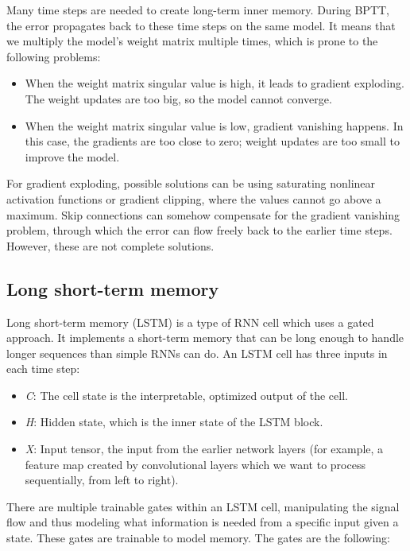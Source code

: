 Many time steps are needed to create long-term inner memory. During BPTT, the error propagates back to these time steps on the same model. It means that we multiply the model's weight matrix multiple times, which is prone to the following problems:

\begin{itemize}
\item When the weight matrix singular value is high, it leads to gradient exploding. The weight updates are too big, so the model cannot converge.
\item When the weight matrix singular value is low, gradient vanishing happens. In this case, the gradients are too close to zero; weight updates are too small to improve the model.
\end{itemize}

For gradient exploding, possible solutions can be using saturating nonlinear activation functions or gradient clipping, where the values cannot go above a maximum. Skip connections can somehow compensate for the gradient vanishing problem, through which the error can flow freely back to the earlier time steps. However, these are not complete solutions.

\subsection{Long short-term memory}

Long short-term memory\cite{LSTM} (LSTM) is a type of RNN cell which uses a gated approach. It implements a short-term memory that can be long enough to handle longer sequences than simple RNNs can do. An LSTM cell has three inputs in each time step:

\begin{itemize}
\item \textit{C}: The cell state is the interpretable, optimized output of the cell.
\item \textit{H}: Hidden state, which is the inner state of the LSTM block.
\item \textit{X}: Input tensor, the input from the earlier network layers (for example, a feature map created by convolutional layers which we want to process sequentially, from left to right).
\end{itemize}

There are multiple trainable gates within an LSTM cell, manipulating the signal flow and thus modeling what information is needed from a specific input given a state. These gates are trainable to model memory. The gates are the following:

